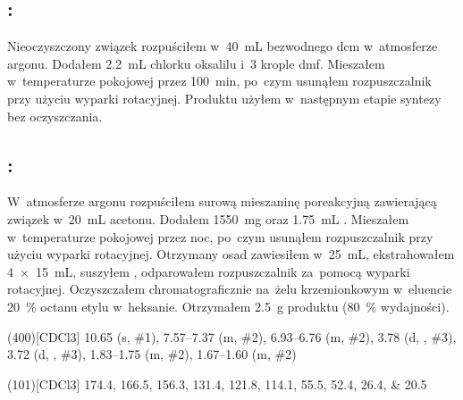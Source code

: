 \subsection{%
  :
}\label{syn:cyclopropyl-methyl-malonate-chloride}
\marginnote{}
Nieoczyszczony związek  rozpuściłem w~\SI{40}{\mL}
  bezwodnego \gls{dcm} w~atmosferze argonu. Dodałem \SI{2.2}{\mL} chlorku oksalilu
  i~\num{3} krople \gls{dmf}.
Mieszałem w~temperaturze pokojowej przez \SI{100}{\minute}, po~czym usunąłem rozpuszczalnik
  przy użyciu wyparki rotacyjnej.
Produktu użyłem w~następnym etapie syntezy bez oczyszczania.

\subsection{%
  :
}\label{syn:amidoester-cycloprop}
\marginnote{}
W~atmosferze argonu rozpuściłem surową mieszaninę poreakcyjną zawierającą związek
   w~\SI{20}{\mL} acetonu.
Dodałem \SI{1550}{\milli\gram}  oraz \SI{1.75}{\mL} .
Mieszałem w~temperaturze pokojowej przez noc, po~czym usunąłem rozpuszczalnik przy użyciu
  wyparki rotacyjnej.
Otrzymany osad zawiesiłem w~\SI{25}{\mL},
  ekstrahowałem \SI[product-units = single]{4 x 15}{\mL},
  suszyłem , odparowałem rozpuszczalnik za~pomocą wyparki rotacyjnej.
Oczyszczałem chromatograficznie na~żelu krzemionkowym w~eluencie \SI{20}{\percent} octanu
  etylu w~heksanie.
Otrzymałem \SI{2.5}{\gram} produktu (\SI{80}{\percent} wydajności).

\begin{fullexp}
  \NMR(400)[CDCl3] \num{10.65} (s, \#{1}), \numrange{7.57}{7.37} (m, \#{2}), \numrange{6.93}{6.76} (m, \#{2}), \num{3.78} (d, , \#{3}), \num{3.72} (d, , \#{3}), \numrange{1.83}{1.75} (m, \#{2}), \numrange{1.67}{1.60} (m, \#{2})\par\noindent
  (101)[CDCl3] \numlist{174.4; 166.5; 156.3; 131.4; 121.8; 114.1; 55.5; 52.4; 26.4; 20.5}
\end{fullexp}



